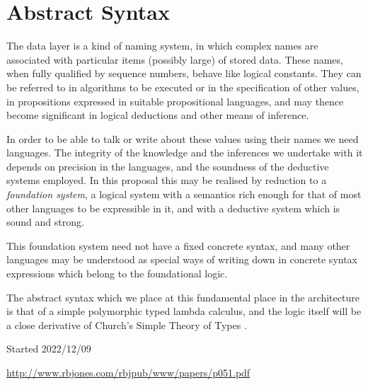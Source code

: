 \documentclass[10pt,titlepage]{article}
\begin{document}
\section{Abstract Syntax}

The data layer is a kind of naming system, in which complex names are associated with particular items (possibly large) of stored data.
These names, when fully qualified by sequence numbers, behave like logical constants.
They can be referred to in algorithms to be executed or in the specification of other values, in propositions expressed in suitable propositional languages, and may thence become significant in logical deductions and other means of inference.

In order to be able to talk or write about these values using their names we need languages.
The integrity of the knowledge and the inferences we undertake with it depends on precision in the languages, and the soundness of the deductive systems employed.
In this proposal this may be realised by reduction to a \emph{foundation system}, a logical system with a semantics rich enough for that of most other languages to be expressible in it, and with a deductive system which is sound and strong.

This foundation system need not have a fixed concrete syntax, and many other languages may be understood as special ways of writing down in concrete syntax expressions which belong to the foundational logic.

The abstract syntax which we place at this fundamental place in the architecture is that of a simple polymorphic typed lambda calculus, and the logic itself will be a close derivative of Church's Simple Theory of Types \cite{Church40}.


\appendix

{}





\tiny{
Started 2022/12/09


\href{http://www.rbjones.com/rbjpub/www/papers/p051.pdf}{http://www.rbjones.com/rbjpub/www/papers/p051.pdf}

}%
\end{document}
